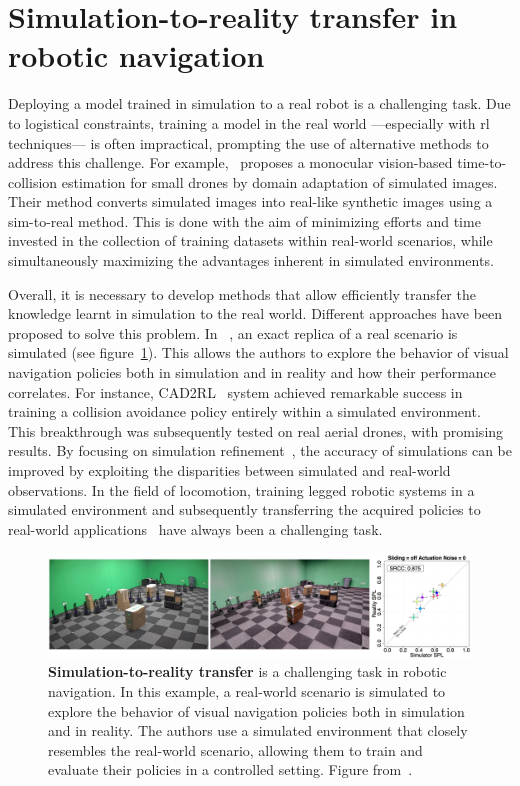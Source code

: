 \section{Simulation-to-reality transfer in robotic navigation}\label{sec:simulation-to-reality-transfer-in-robotic-navigation}
Deploying a model trained in simulation to a real robot is a challenging task.
Due to logistical constraints, training a model in the real world —especially with \acrshort{rl} techniques— is often impractical, prompting the use of alternative methods to address this challenge.
For example,~\cite{kim2022} proposes a monocular vision-based time-to-collision estimation for small drones by domain adaptation of simulated images.
Their method converts simulated images into real-like synthetic images using a sim-to-real method.
This is done with the aim of minimizing efforts and time invested in the collection of training datasets within real-world scenarios, while simultaneously maximizing the advantages inherent in simulated environments.

Overall, it is necessary to develop methods that allow efficiently transfer the knowledge learnt in simulation to the real world.
Different approaches have been proposed to solve this problem.
In ~\cite{kadian2020}, an exact replica of a real scenario is simulated (see figure~\ref{fig:sim2real}).
This allows the authors to explore the behavior of visual navigation policies both in simulation and in reality and how their performance correlates.
For instance, CAD2RL~\cite{sadeghiCAD2RLRealSingleImage2017} system achieved remarkable success in training a collision avoidance policy entirely within a simulated environment.
This breakthrough was subsequently tested on real aerial drones, with promising results.
By focusing on simulation refinement~\cite{Son2020}, the accuracy of simulations can be improved by exploiting the disparities between simulated and real-world observations.
In the field of locomotion, training legged robotic systems in a simulated environment and subsequently transferring the acquired policies to real-world applications~\cite{Hwangbo_2019, agarwal2022} have always been a challenging task.

\begin{figure}
    \includegraphics[width=\textwidth]{figures/related_work/sim2real}
    \caption{\textbf{Simulation-to-reality transfer} is a challenging task in robotic navigation.
    In this example, a real-world scenario is simulated to explore the behavior of visual navigation policies both in simulation and in reality.
    The authors use a simulated environment that closely resembles the real-world scenario, allowing them to train and evaluate their policies in a controlled setting.
    Figure from~\cite{kadian2020}.}
    \label{fig:sim2real}
\end{figure}


